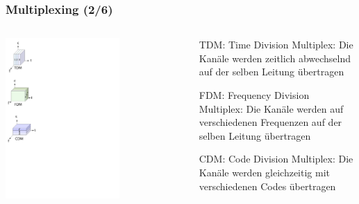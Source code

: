 \documentclass[ignorenonframetext]{beamer}
\begin{document}
\begin{frame}
\frametitle{Multiplexing (2/6)}
\begin{columns}
\begin{column}{3cm}
\begin{center}
\includegraphics[width=0.7\textwidth]{multiplex}
\end{center}
\end{column}
\begin{column}{8cm}
\begin{itemize}
\item[TDM:] Time Division Multiplex: Die Kan\"ale werden zeitlich abwechselnd auf
	der selben Leitung \"ubertragen
\item[FDM:] Frequency Division Multiplex: Die Kan\"ale werden auf verschiedenen Frequenzen
	auf der selben Leitung \"ubertragen
\item[CDM:] Code Division Multiplex: Die Kan\"ale werden gleichzeitig mit verschiedenen
	Codes \"ubertragen
\end{itemize}
\end{column}
\end{columns}
\end{frame}
\end{document}

